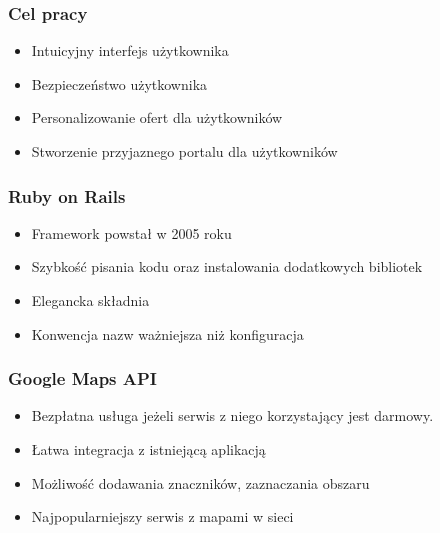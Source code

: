 \documentclass{beamer}
\begin{document}


\begin{frame}
\frametitle{Cel pracy}
\begin{itemize}
\item Intuicyjny interfejs użytkownika
\item Bezpieczeństwo użytkownika
\item Personalizowanie ofert dla użytkowników
\item Stworzenie przyjaznego portalu dla użytkowników
\end{itemize}

\end{frame}


\begin{frame}
\frametitle{Ruby on Rails}
\begin{itemize}
\item Framework powstał w 2005 roku
\item Szybkość pisania kodu oraz instalowania dodatkowych bibliotek
\item Elegancka składnia
\item Konwencja nazw ważniejsza niż konfiguracja
\end{itemize}

\end{frame}


\begin{frame}
\frametitle{Google Maps API}
\begin{itemize}
\item Bezpłatna usługa jeżeli serwis z niego korzystający jest darmowy.
\item Łatwa integracja z istniejącą aplikacją
\item Możliwość dodawania znaczników, zaznaczania obszaru
\item Najpopularniejszy serwis z mapami w sieci
\end{itemize}

\end{frame}

\end{document}
